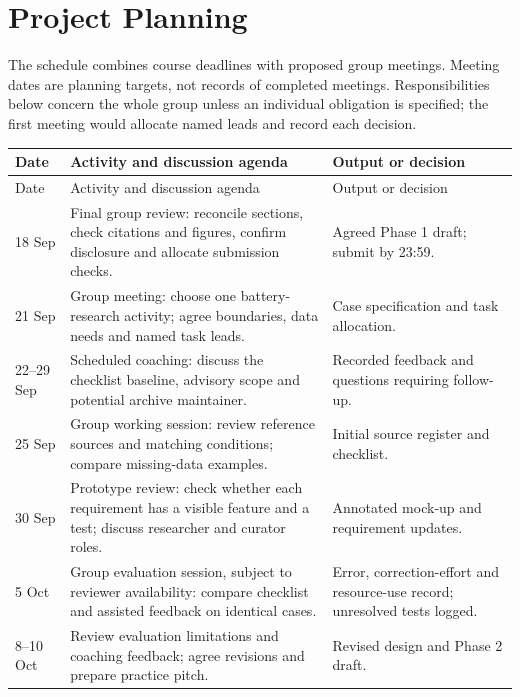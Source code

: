 \documentclass[11pt,a4paper]{article}
\begin{document}

\clearpage

\section{Project Planning}
The schedule combines course deadlines with proposed group meetings. Meeting dates are planning targets, not records of completed meetings. Responsibilities below concern the whole group unless an individual obligation is specified; the first meeting would allocate named leads and record each decision.

{\small
\begin{longtable}{@{}p{}p{}p{}@{}}
\toprule Date & Activity and discussion agenda & Output or decision \\
\midrule\endfirsthead
\toprule Date & Activity and discussion agenda & Output or decision \\
\midrule\endhead
18 Sep & Final group review: reconcile sections, check citations and figures, confirm disclosure and allocate submission checks. & Agreed Phase 1 draft; submit by 23:59. \\
\midrule
21 Sep & Group meeting: choose one battery-research activity; agree boundaries, data needs and named task leads. & Case specification and task allocation. \\
\midrule
22--29 Sep & Scheduled coaching: discuss the checklist baseline, advisory scope and potential archive maintainer. & Recorded feedback and questions requiring follow-up. \\
\midrule
25 Sep & Group working session: review reference sources and matching conditions; compare missing-data examples. & Initial source register and checklist. \\
\midrule
30 Sep & Prototype review: check whether each requirement has a visible feature and a test; discuss researcher and curator roles. & Annotated mock-up and requirement updates. \\
\midrule
5 Oct & Group evaluation session, subject to reviewer availability: compare checklist and assisted feedback on identical cases. & Error, correction-effort and resource-use record; unresolved tests logged. \\
\midrule
8--10 Oct & Review evaluation limitations and coaching feedback; agree revisions and prepare practice pitch. & Revised design and Phase 2 draft. \\

\end{longtable}}
\end{document}
